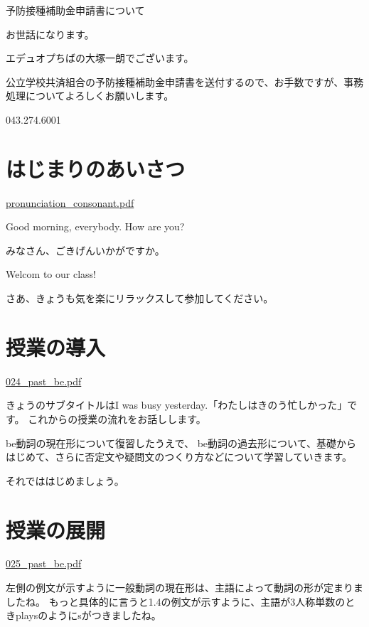 \documentclass[12pt,jafontscale=0.9247]{jlreq}
\begin{document}
\bigskip

\begin{center}
 予防接種補助金申請書について
\end{center}

\bigskip

お世話になります。

エデュオプちばの大塚一朗でございます。

公立学校共済組合の予防接種補助金申請書を送付するので、お手数ですが、事務処理についてよろしくお願いします。


\bigskip

\bigskip

\hfill{}043.274.6001









\newpage
\section{はじまりのあいさつ}

\hfill{}\url{pronunciation_consonant.pdf}

Good morning, everybody. How are you?

みなさん、ごきげんいかがですか。

Welcom to our class!

さあ、きょうも気を楽にリラックスして参加してください。

\section{授業の導入}

\hfill\url{024_past_be.pdf}

きょうのサブタイトルはI was busy yesterday.「わたしはきのう忙しかった」です。
これからの授業の流れをお話しします。

be動詞の現在形について復習したうえで、
be動詞の過去形について、基礎からはじめて、さらに否定文や疑問文のつくり方などについて学習していきます。

それでははじめましょう。

\section{授業の展開}

\hfill\url{025_past_be.pdf}

左側の例文が示すように一般動詞の現在形は、主語によって動詞の形が定まりましたね。
もっと具体的に言うと1.4の例文が示すように、主語が3人称単数のときplaysのようにsがつきましたね。
\end{document}
